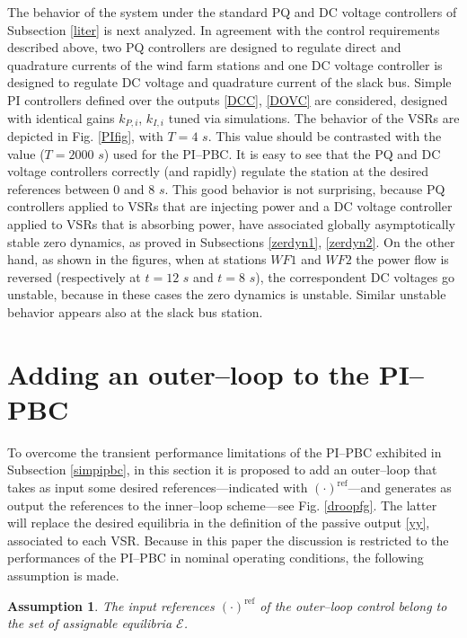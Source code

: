 \documentclass[5p,twocolumn]{elsarticle}
\def\lab{\label}
\newtheorem{assumption}[theorem]{Assumption}
\numberwithin{equation}{section}
\begin{document}
The behavior of the system under the standard PQ and DC voltage controllers of Subsection \ref{liter} is next analyzed. In agreement with the control requirements described above, two PQ controllers are designed to regulate direct and quadrature currents of the wind farm  stations  and one DC voltage controller is designed to regulate DC voltage and quadrature current of the slack bus. Simple PI controllers defined over the outputs \eqref{DCC}, \eqref{DOVC} are considered, designed with identical gains $k_{P,i}$, $k_{I,i}$ tuned via simulations. The behavior of the VSRs are depicted in Fig. \ref{PIfig}, with $T=4$ $s$. This value should be contrasted with the value ($T=2000$ $s$) used for the PI--PBC. It is easy to see that the PQ and DC voltage controllers correctly (and rapidly) regulate the station at the desired references between $0$ and $8$ $s$. This good behavior is not surprising, because PQ controllers applied to VSRs that are injecting power and a DC voltage controller applied to VSRs that is absorbing power, have associated globally asymptotically stable zero dynamics, as proved in Subsections \ref{zerdyn1}, \ref{zerdyn2}. On the other hand, as shown in the figures, when at stations $WF1$ and $WF2$ the power flow is reversed (respectively at $t=12$ $s$ and $t=8$ $s$), the correspondent DC voltages go unstable, because in these cases the zero dynamics is unstable. Similar unstable behavior appears also at the slack bus station.


\section{Adding an outer--loop to the PI--PBC}
\lab{sec6}
To overcome the transient performance limitations of the PI--PBC exhibited in Subsection \ref{simpipbc}, in this section it is proposed to add an outer--loop that takes as input some desired references---indicated with $(\cdot)^{\mathrm{ref}}$---and generates as output the references to the inner--loop scheme---see Fig. \ref{droopfg}. The latter will replace the desired equilibria in the definition of the passive output \eqref{yy}, associated to each VSR. Because in this paper the discussion is restricted to the performances of the PI--PBC in nominal operating conditions, the following assumption is made.
\smallbreak

\begin{assumption}\label{assref} The input references $(\cdot)^{\mathrm{ref}}$ of the outer--loop control belong to the set of assignable equilibria $\mathcal{E}$.
\end{assumption}
\smallbreak
\end{document}

